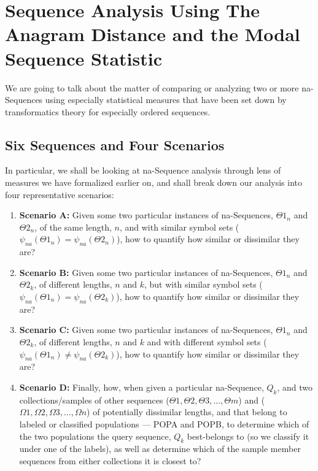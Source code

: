\documentclass[a4paper, 18pt]{book} %
\begin{document}
\chapter{Sequence Analysis Using The Anagram Distance and the Modal Sequence Statistic}
\label{SEC4A}


We are going to talk about the matter of comparing or analyzing two or more na-Sequences using especially statistical measures that have been set down by transformatics theory for especially ordered sequences. 

\section{Six Sequences and Four Scenarios}
\label{SEC4ASEQ}

In particular, we shall be looking at na-Sequence analysis through lens of measures we have formalized earlier on, and shall break down our analysis into four representative scenarios:

\begin{enumerate}
\item \textbf{Scenario A:} Given some two particular instances of na-Sequences, $\Theta1_n$ and $\Theta2_n$, of the same length, $n$, and with similar symbol sets ($\psi_{na}(\Theta1_n) = \psi_{na}(\Theta2_n)$), how to quantify how similar or dissimilar they are?
\item \textbf{Scenario B:} Given some two particular instances of na-Sequences, $\Theta1_n$ and $\Theta2_k$, of different lengths, $n$ and $k$, but with similar symbol sets ($\psi_{na}(\Theta1_n) = \psi_{na}(\Theta2_k)$), how to quantify how similar or dissimilar they are?
\item \textbf{Scenario C:} Given some two particular instances of na-Sequences, $\Theta1_n$ and $\Theta2_k$, of different lengths, $n$ and $k$ and with different symbol sets ($\psi_{na}(\Theta1_n) \neq \psi_{na}(\Theta2_k)$), how to quantify how similar or dissimilar they are?
\item \textbf{Scenario D:} Finally, how, when given a particular na-Sequence, $Q_k$, and two collections/samples of other sequences ($\Theta1, \Theta2, \Theta3,..., \Theta m$) and ($\Omega1, \Omega2, \Omega3,..., \Omega n$) of potentially dissimilar lengths, and that belong to labeled or classified populations --- POPA and POPB, to determine which of the two populations the query sequence, $Q_k$ best-belongs to (so we classify it under one of the labels), as well as determine which of the sample member sequences from either collections it is closest to?
\end{enumerate}
\end{document}

